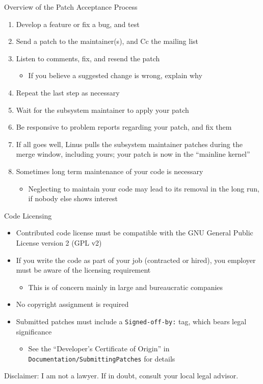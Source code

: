 \documentclass{beamer}
\begin{document}
\begin{frame}{Overview of the Patch Acceptance Process}
  \begin{enumerate}
  \item Develop a feature or fix a bug, and test
  \item Send a patch to the maintainer(s), and Cc the mailing list
  \item Listen to comments, fix, and resend the patch
    \begin{itemize}
    \item If you believe a suggested change is wrong, explain why
    \end{itemize}
  \item Repeat the last step as necessary
  \item Wait for the subsystem maintainer to apply your patch
  \item Be responsive to problem reports regarding your patch, and fix
    them
  \item If all goes well, Linus pulls the subsystem maintainer patches
    during the merge window, including yours; your patch is now in the
    ``mainline kernel''
  \item Sometimes long term maintenance of your code is necessary
    \begin{itemize}
    \item Neglecting to maintain your code may lead to its removal in
      the long run, if nobody else shows interest
    \end{itemize}
  \end{enumerate}
\end{frame}

\begin{frame}{Code Licensing}
  \begin{itemize}
  \item Contributed code license must be compatible with the GNU
    General Public License version 2 (GPL v2)
  \item If you write the code as part of your job (contracted or
    hired), you employer must be aware of the licensing requirement
    \begin{itemize}
    \item This is of concern mainly in large and bureaucratic companies
    \end{itemize}
  \item No copyright assignment is required
  \item Submitted patches must include a \texttt{Signed-off-by:} tag,
    which bears legal significance
    \begin{itemize}
    \item See the ``Developer's Certificate of Origin'' in
      \texttt{Documentation/SubmittingPatches} for details
    \end{itemize}
  \end{itemize}
  Disclaimer: I am not a lawyer. If in doubt, consult your local legal
  advisor.
\end{frame}
\end{document}
